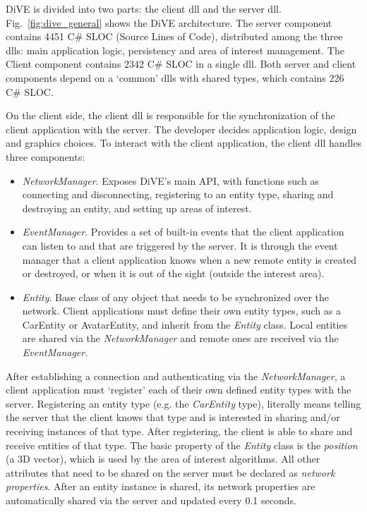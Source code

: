 \documentclass[]{elsarticle}
\begin{document}
DiVE is divided into two parts: the client dll and the server dll. Fig.~\ref{fig:dive_general} shows the DiVE architecture. The server component contains 4451 C\# SLOC (Source Lines of Code), distributed among the three dlls: main application logic, persistency and area of interest management. The Client component contains 2342 C\# SLOC in a single dll. Both server and client components depend on a `common' dlls with shared types, which contains 226 C\# SLOC.

On the client side, the client dll is responsible for the synchronization of the client application with the server.
The developer decides application logic, design and graphics choices.
To interact with the client application, the client dll handles three components:
\begin{itemize}
\item \textit{NetworkManager}. Exposes DiVE's main API, with functions such as connecting and disconnecting, registering to an entity type, sharing and destroying an entity, and setting up areas of interest.

\item \textit{EventManager}. Provides a set of built-in events that the client application can listen to and that are triggered by the server. It is through the event manager that a client application knows when a new remote entity is created or destroyed, or when it is out of the sight (outside the interest area).

\item \textit{Entity}. Base class of any object that needs to be synchronized over the network. Client applications must define their own entity types, such as a CarEntity or AvatarEntity, and inherit from the \textit{Entity} class. Local entities are shared via the \textit{NetworkManager} and remote ones are received via the \textit{EventManager}.

\end{itemize}

After establishing a connection and authenticating via the \textit{NetworkManager}, a client application must `register' each of their own defined entity types with the server. Registering an entity type (e.g. the \textit{CarEntity} type), literally means telling the server that the client knows that type and is interested in sharing and/or receiving instances of that type. After registering, the client is able to share and receive entities of that type.
The basic property of the \textit{Entity} class is the \textit{position} (a 3D vector), which is used by the area of interest algorithms. All other attributes that need to be shared on the server must be declared as \textit{network properties}. After an entity instance is shared, its network properties are automatically shared via the server and updated every 0.1 seconds.
\end{document}
